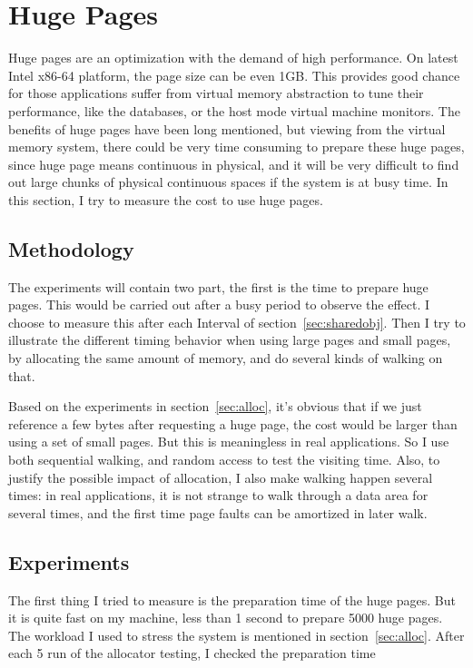 \section{Huge Pages}
	\label{sec:hugepage}
Huge pages are an optimization with the demand of high performance. On latest
Intel x86-64 platform, the page size can be even 1GB. This provides good
chance for those applications suffer from virtual memory abstraction to tune
their performance, like the databases, or the host mode virtual machine monitors.
The benefits of huge pages have been long mentioned, but viewing from the
virtual memory system, there could be very time consuming to prepare these
huge pages, since huge page means continuous in physical, and it will be very
difficult to find out large chunks of physical continuous spaces if the system is
at busy time. In this section, I try to measure the cost to use huge pages.

\subsection{Methodology}
The experiments will contain two part, the first is the time to prepare huge
pages. This would be carried out after a busy period to observe the effect. I
choose to measure this after each Interval of section~\ref{sec:sharedobj}. Then
I try to illustrate the different timing behavior when using large pages and
small pages, by allocating the same amount of memory, and do several kinds of
walking on that.

Based on the experiments in section~\ref{sec:alloc}, it's obvious that if we
just reference a few bytes after requesting a huge page, the cost would be
larger than using a set of small pages. But this is meaningless in real
applications. So I use both sequential walking, and random access to test
the visiting time. Also, to justify the possible impact of allocation, I
also make walking happen several times: in real applications, it is not
strange to walk through a data area for several times, and the first time
page faults can be amortized in later walk.

\subsection{Experiments}
The first thing I tried to measure is the preparation time of the huge pages.
But it is quite fast on my machine, less than 1 second to prepare 5000 huge
pages. The workload I used to stress the system is mentioned in section~\ref{sec:alloc}. After each 5 run of the allocator testing, I checked the preparation time


